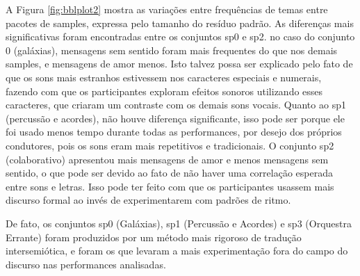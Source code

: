 A Figura \ref{fig:bblplot2} mostra as variações entre frequências de temas entre pacotes de samples, expressa pelo tamanho do resíduo padrão. As diferenças mais significativas foram encontradas entre os conjuntos sp0 e sp2. no caso do conjunto 0 (galáxias), mensagens sem sentido foram mais frequentes do que nos demais samples, e mensagens de amor menos. Isto talvez possa ser explicado pelo fato de que os sons mais estranhos estivessem nos caracteres especiais e numerais, fazendo com que os participantes exploram efeitos sonoros utilizando esses caracteres, que criaram um contraste com os demais sons vocais. Quanto ao sp1 (percussão e acordes), não houve diferença significante, isso pode ser porque ele foi usado menos tempo durante todas as performances, por desejo dos próprios condutores, pois os sons eram mais repetitivos e tradicionais. O conjunto sp2 (colaborativo) apresentou mais mensagens de amor e menos mensagens sem sentido, o que pode ser devido ao fato de não haver uma correlação esperada entre sons e letras. Isso pode ter feito com que os participantes usassem mais discurso formal ao invés de experimentarem com padrões de ritmo. 

De fato, os conjuntos sp0 (Galáxias), sp1 (Percussão e Acordes) e sp3 (Orquestra Errante) foram produzidos por um método mais rigoroso de tradução intersemiótica, e foram os que levaram a mais experimentação fora do campo do discurso nas performances analisadas. 


